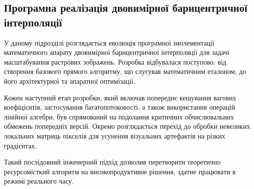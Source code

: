 \subsection{Програмна реалізація двовимірної барицентричної інтерполяції}
У даному підрозділі розглядається еволюція програмної імплементації математичного апарату двовимірної барицентричної інтерполяції для задачі масштабування растрових зображень. Розробка відбувалася поступово: від створення базового прямого алгоритму, що слугував математичним еталоном, до його архітектурної та апаратної оптимізації. 

Кожен наступний етап розробки, який включав попереднє кешування вагових коефіцієнтів, застосування багатопотоковості, а також використання операцій лінійної алгебри, був спрямований на подолання критичних обчислювальних обмежень попередніх версій. Окремо розглядається перехід до обробки невеликих локальних матриць пікселів для усунення візуальних артефактів на різких градієнтах. 

Такий послідовний інженерний підхід дозволив перетворити теоретично ресурсомісткий алгоритм на високопродуктивне рішення, здатне працювати в режимі реального часу.




